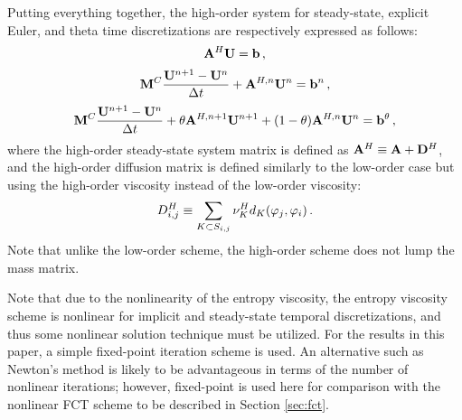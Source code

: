 Putting everything together, the high-order system for steady-state,
explicit Euler, and theta time discretizations are respectively expressed
as follows:
\begin{equation}\label{eq:high_ss}
  \mathbf{A}^H \mathbf{U} = \mathbf{b} \,,
\end{equation}
\begin{equation}\label{eq:high_fe}
  \mathbf{M}^C\frac{\mathbf{U}^{n+1} - \mathbf{U}^n}{\Delta t} + \mathbf{A}^{H,n}\mathbf{U}^n = \mathbf{b}^n \,,
\end{equation}
\begin{equation}\label{eq:high_theta}
  \mathbf{M}^C\frac{\mathbf{U}^{n+1} - \mathbf{U}^n}{\Delta t} + \theta\mathbf{A}^{H,n+1}\mathbf{U}^{n+1}
    + (1-\theta)\mathbf{A}^{H,n}\mathbf{U}^n
    = \mathbf{b}^\theta \,,
\end{equation}
where the high-order steady-state system matrix is defined as
$\mathbf{A}^H\equiv\mathbf{A} + \mathbf{D}^H$, and the high-order diffusion matrix is defined similarly
to the low-order case but using the high-order viscosity instead of the low-order
viscosity:
\begin{equation}\label{eq:high_order_diffusion_matrix}
  D_{i,j}^H \equiv
    \sum\limits_{K\subset S_{i,j}}\nu^H_K
    d_K(\varphi_j,\varphi_i) \,.
\end{equation}
Note that unlike the low-order scheme, the high-order scheme does not lump the
mass matrix.

\begin{rmk}
Note that due to the nonlinearity of the entropy viscosity, the entropy viscosity
scheme is nonlinear for implicit and steady-state temporal discretizations, and
thus some nonlinear solution technique must be utilized. For the results in
this paper, a simple fixed-point iteration scheme is used. An alternative
such as Newton's method is likely to be advantageous in terms of the number
of nonlinear iterations; however, fixed-point is used here for comparison
with the nonlinear FCT scheme to be described in Section \ref{sec:fct}.
\end{rmk}
